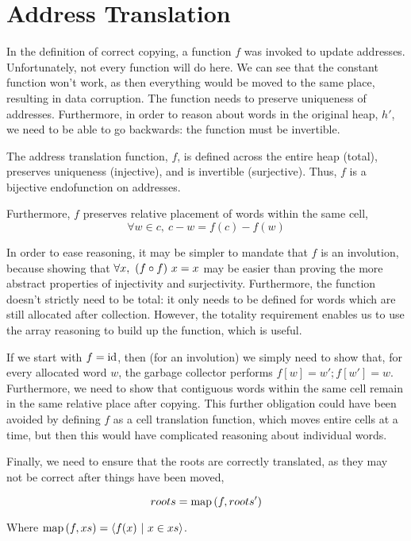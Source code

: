 \section{Address Translation}
\label{sec:copying-address}

In the definition of correct copying, a function $f$ was invoked to
update addresses. Unfortunately, not every function will do here. We
can see that the constant function won't work, as then everything
would be moved to the same place, resulting in data corruption. The
function needs to preserve uniqueness of addresses. Furthermore, in
order to reason about words in the original heap, $h'$, we need to be
able to go backwards: the function must be invertible.

\begin{definition}
  \label{def:c-address-translation-function}
  The address translation function, $f$, is defined across the entire
  heap (total), preserves uniqueness (injective), and is invertible
  (surjective). Thus, $f$ is a bijective endofunction on addresses.

  Furthermore, $f$ preserves relative placement of words within the
  same cell, \[\forall w \in c,\ c - w = f(c) - f(w)\]
\end{definition}

In order to ease reasoning, it may be simpler to mandate that $f$ is
an involution, because showing that $\forall x,\ (f \circ f)~x = x$ may
be easier than proving the more abstract properties of injectivity and
surjectivity. Furthermore, the function doesn't strictly need to be
total: it only needs to be defined for words which are still allocated
after collection. However, the totality requirement enables us to use
the array reasoning to build up the function, which is useful.

If we start with $f = \mathrm{id}$, then (for an involution) we simply need to
show that, for every allocated word $w$, the garbage collector
performs $f[w] = w'; f[w'] = w$. Furthermore, we need to show that
contiguous words within the same cell remain in the same relative
place after copying. This further obligation could have been avoided
by defining $f$ as a cell translation function, which moves entire
cells at a time, but then this would have complicated reasoning about
individual words.

Finally, we need to ensure that the roots are correctly translated, as
they may not be correct after things have been moved,

\begin{definition}
  \label{def:c-root-translation}
  \[roots = \mathrm{map}\left(f, roots'\right)\]

  Where $\mathrm{map}\left(f, xs\right) = \langle f(x)~|~x \in xs \rangle$.
\end{definition}

